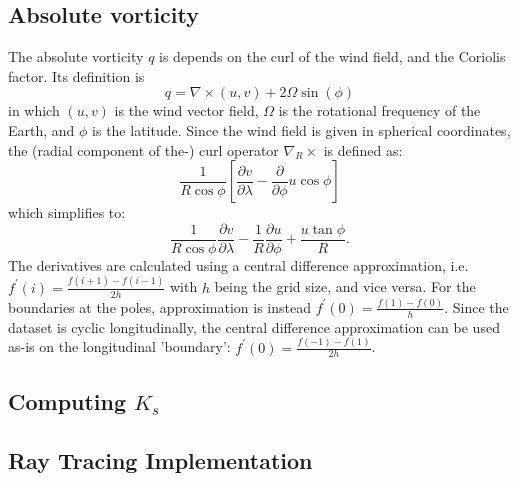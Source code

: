 \documentclass[]{article}
\begin{document}
	\subsection{Absolute vorticity}
	The absolute vorticity $q$ is depends on the curl of the wind field, and the Coriolis factor. Its definition is
	\begin{equation*}
		q=\nabla\times(u, v)+2\Omega\sin(\phi)
	\end{equation*}
	in which $(u, v)$ is the wind vector field, $\Omega$ is the rotational frequency of the Earth, and $\phi$ is the latitude. Since the wind field is given in spherical coordinates, the (radial component of the-) curl operator $\nabla_R\times$ is defined as:
	\begin{equation*}
		\frac{1}{R\cos\phi}\left[\frac{\partial v}{\partial \lambda}-\frac{\partial}{\partial \phi}u\cos\phi\right]
	\end{equation*}
	which simplifies to:
	\begin{equation*}
		\frac{1}{R\cos\phi}\frac{\partial v}{\partial \lambda}-\frac{1}{R}\frac{\partial u}{\partial \phi}+\frac{u\tan\phi}{R}.
	\end{equation*}
	The derivatives are calculated using a central difference approximation, i.e. $f^\prime(i)=\tfrac{f(i+1)-f(i-1)}{2h}$ with $h$ being the grid size, and vice versa. For the boundaries at the poles, approximation is instead $f^\prime(0)=\tfrac{f(1)-f(0)}{h}$. Since the dataset is cyclic longitudinally, the central difference approximation can be used as-is on the longitudinal 'boundary': $f^\prime(0)=\tfrac{f(-1)-f(1)}{2h}$.
	 
	\subsection{Computing $K_s$}
	
	\subsection{Ray Tracing Implementation}
	
\end{document}
